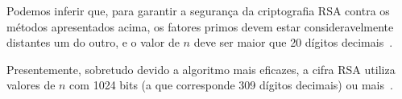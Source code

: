 Podemos inferir que, para garantir a segurança da criptografia RSA contra os métodos apresentados acima, os fatores primos devem estar consideravelmente distantes um do outro, e o valor de $n$ deve ser maior que 20 dígitos decimais~\cite{Quaresma2009a}.

Presentemente, sobretudo devido a algoritmo mais eficazes, a cifra RSA utiliza valores de $n$ com 1024 bits (a que corresponde 309 dígitos decimais) ou mais~\cite{Quaresma2009a}.\footnotemark[1]



